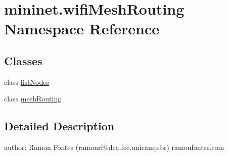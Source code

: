 \hypertarget{namespacemininet_1_1wifiMeshRouting}{\section{mininet.\-wifi\-Mesh\-Routing Namespace Reference}
\label{namespacemininet_1_1wifiMeshRouting}
}
\subsection*{Classes}
\begin{DoxyCompactItemize}
\item 
class \hyperlink{classmininet_1_1wifiMeshRouting_1_1listNodes}{list\-Nodes}
\item 
class \hyperlink{classmininet_1_1wifiMeshRouting_1_1meshRouting}{mesh\-Routing}
\end{DoxyCompactItemize}


\subsection{Detailed Description}
\begin{DoxyVerb}author: Ramon Fontes (ramonrf@dca.fee.unicamp.br)
        ramonfontes.com
\end{DoxyVerb}
 
